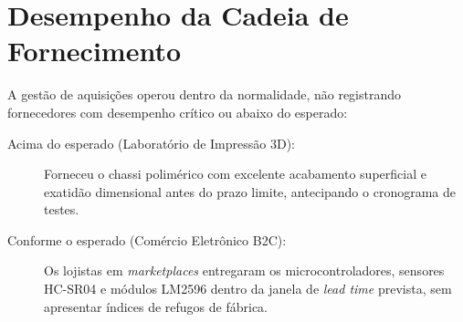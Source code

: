 \section{Desempenho da Cadeia de Fornecimento}

A gestão de aquisições operou dentro da normalidade, não registrando fornecedores com desempenho crítico ou abaixo do esperado:

\begin{description}
    \item[Acima do esperado (Laboratório de Impressão 3D):] Forneceu o chassi polimérico com excelente acabamento superficial e exatidão dimensional antes do prazo limite, antecipando o cronograma de testes.
    \item[Conforme o esperado (Comércio Eletrônico B2C):] Os lojistas em \textit{marketplaces} entregaram os microcontroladores, sensores HC-SR04 e módulos LM2596 dentro da janela de \textit{lead time} prevista, sem apresentar índices de refugos de fábrica.
\end{description}